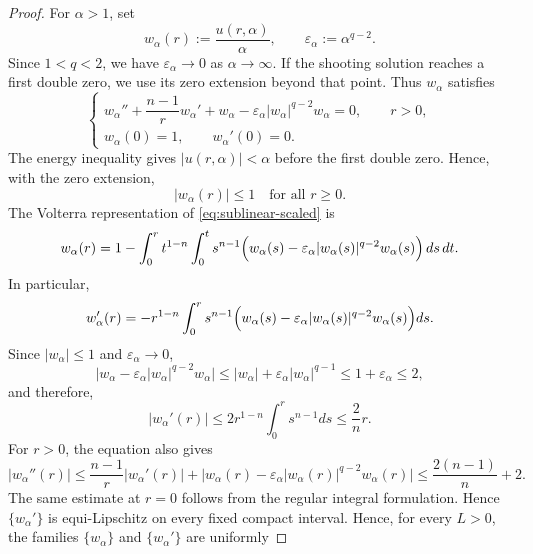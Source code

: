 \documentclass[10pt,a4paper]{amsart}
\begin{document}
\begin{proof}
For $\alpha>1$, set
\[
 w_\alpha(r):=\frac{u(r,\alpha)}{\alpha},
 \qquad
 \varepsilon_\alpha:=\alpha^{q-2}.
\]
Since $1<q<2$, we have $\varepsilon_\alpha\rightarrow0$ as $\alpha\to\infty$.
If the shooting solution reaches a first double zero, we use its zero extension beyond that point. Thus $w_\alpha$ satisfies
\begin{equation}
 \begin{cases}
 w_\alpha''+\dfrac{n-1}{r}w_\alpha'+w_\alpha
 -\varepsilon_\alpha|w_\alpha|^{q-2}w_\alpha=0,\qquad  r>0,\\[4pt]
 w_\alpha(0)=1,\qquad w_\alpha'(0)=0.
 \end{cases}
 \label{eq:sublinear-scaled}
\end{equation}
  The energy inequality gives
$|u(r,\alpha)|<\alpha$ before the first double zero. Hence, with the zero extension,
\begin{equation}
|w_\alpha(r)|\leq1
\quad\text{for all }r\geq0.
\label{eq:upper1}
\end{equation}
The Volterra representation of \eqref{eq:sublinear-scaled} is
\begin{align}
 w_\alpha(r)=1-
 \int_0^r t^{1-n}\int_0^t s^{n-1}
 \Bigl(w_\alpha(s)-\varepsilon_\alpha
 |w_\alpha(s)|^{q-2}w_\alpha(s)\Bigr)\,ds\,dt.
 \label{eq:sublinear-volterra}
\end{align}
In particular,
\begin{equation*}
w_\alpha'(r)=
-r^{1-n}\int_0^r s^{n-1}
\Bigl(
w_\alpha(s)
-\varepsilon_\alpha
|w_\alpha(s)|^{q-2}w_\alpha(s)
\Bigr)ds.
\end{equation*}
Since {$|w_\alpha|\leq1$} and $\varepsilon_\alpha\rightarrow0$,
\begin{equation*}
\big|w_\alpha-\varepsilon_\alpha
|w_\alpha|^{q-2}w_\alpha\big|\leq |w_\alpha|+\varepsilon_\alpha|w_\alpha|^{q-1}\leq 1+\varepsilon_\alpha\leq2,
\end{equation*}
and therefore,
\begin{equation*}
|w_\alpha'(r)|\leq
2r^{1-n}\int_0^r s^{n-1}ds\leq \frac{2}{n}r.
\end{equation*}
{For $r>0$, the equation also gives
\[
 |w_\alpha''(r)|
 \le \frac{n-1}{r}|w_\alpha'(r)|
 +\bigl|w_\alpha(r)-\varepsilon_\alpha
 |w_\alpha(r)|^{q-2}w_\alpha(r)\bigr|
 \le \frac{2(n-1)}{n}+2.
\]
The same estimate at $r=0$ follows from the regular integral
formulation. Hence $\{w_\alpha'\}$ is equi-Lipschitz on every fixed
compact interval.}
Hence, for every
$L>0$, the families $\{w_\alpha\}$ and $\{w_\alpha'\}$ are uniformly

\end{proof}
\end{document}
